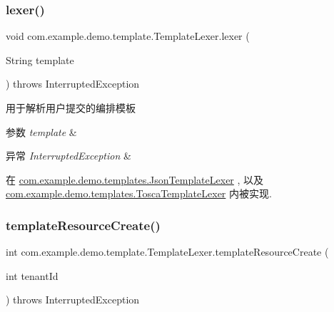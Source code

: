 \subsubsection{\texorpdfstring{lexer()}{lexer()}}
{\footnotesize\ttfamily void com.\+example.\+demo.\+template.\+Template\+Lexer.\+lexer (\begin{DoxyParamCaption}\item[{String}]{template }\end{DoxyParamCaption}) throws Interrupted\+Exception}

用于解析用户提交的编排模板 
\begin{DoxyParams}{参数}
{\em template} & \\
\hline
\end{DoxyParams}

\begin{DoxyExceptions}{异常}
{\em Interrupted\+Exception} & \\
\hline
\end{DoxyExceptions}


在 \mbox{\hyperlink{classcom_1_1example_1_1demo_1_1templates_1_1_json_template_lexer_a4f0fbcb833c9dda8248465d9a1baec59}{com.\+example.\+demo.\+templates.\+Json\+Template\+Lexer}} , 以及 \mbox{\hyperlink{classcom_1_1example_1_1demo_1_1templates_1_1_tosca_template_lexer_af453b08a7efd5b0b33bcdf8ff085af84}{com.\+example.\+demo.\+templates.\+Tosca\+Template\+Lexer}} 内被实现.

\mbox{\label{interfacecom_1_1example_1_1demo_1_1template_1_1_template_lexer_a652b7317dde4c2b055f682dec4092703}} 
\subsubsection{\texorpdfstring{template\+Resource\+Create()}{templateResourceCreate()}}
{\footnotesize\ttfamily int com.\+example.\+demo.\+template.\+Template\+Lexer.\+template\+Resource\+Create (\begin{DoxyParamCaption}\item[{int}]{tenant\+Id }\end{DoxyParamCaption}) throws Interrupted\+Exception}

